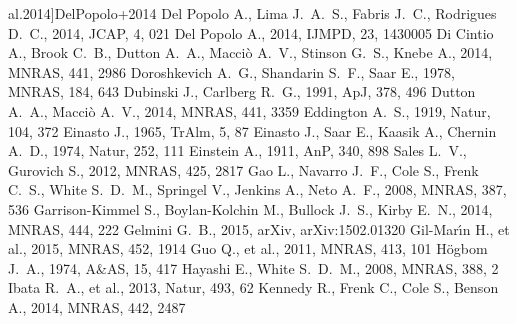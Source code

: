 \documentclass[a4wide,12pt]{book}
\begin{document}
\begin{thebibliography}{}
{al.}{2014}]{DelPopolo+2014} Del Popolo A., Lima J.~A.~S., Fabris 
J.~C., Rodrigues D.~C., 2014, JCAP, 4, 021 
Del Popolo A., 2014, IJMPD, 23, 1430005  
 Di Cintio A., Brook C.~B., Dutton A.~A., 
Macci{\`o} A.~V., Stinson G.~S., Knebe A., 2014, MNRAS, 441, 2986 
 Doroshkevich A.~G., Shandarin S.~F., Saar E., 1978, MNRAS, 184, 643 
 Dubinski J., Carlberg R.~G., 1991, ApJ, 378, 496 
 Dutton A.~A., Macci{\`o} A.~V., 2014, MNRAS, 441, 3359 
Eddington A.~S., 1919, Natur, 104, 372
Einasto J., 1965, TrAlm, 5, 87
 Einasto J., Saar E., Kaasik A., Chernin 
A.~D., 1974, Natur, 252, 111 
Einstein A., 1911, AnP, 340, 898 
Sales L.~V., Gurovich S., 2012, MNRAS, 425, 2817
Gao L., Navarro J.~F., Cole S., Frenk C.~S., White S.~D.~M., Springel V., 
Jenkins A., Neto A.~F., 2008, MNRAS, 387, 536
 Garrison-Kimmel S., Boylan-Kolchin M., 
Bullock J.~S., Kirby E.~N., 2014, MNRAS, 444, 222
Gelmini G.~B., 2015, arXiv, arXiv:1502.01320
 Gil-Mar{\'{\i}}n H., et al., 2015, MNRAS, 
452, 1914  
Guo Q., et al., 2011, MNRAS, 413, 101 
 H{\"o}gbom J.~A., 1974, A\&AS, 15, 417  
 Hayashi E., White S.~D.~M., 2008, MNRAS, 388, 2 
Ibata R.~A., et al., 2013, Natur, 493, 62
 Kennedy R., Frenk C., Cole S., Benson A., 
2014, MNRAS, 442, 2487 

\end{thebibliography}
\end{document}
